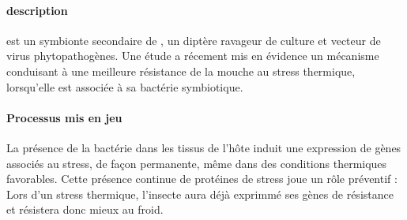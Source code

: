 \paragraph{description} %
\label{par:description_whitefly}

 est un symbionte secondaire de , un
diptère ravageur de culture et vecteur de virus phytopathogènes. Une étude
\cite{brumin2011} a récement mis en évidence un mécanisme conduisant à une
meilleure résistance de la mouche au stress thermique, lorsqu'elle est
associée à sa bactérie symbiotique.

\paragraph{Processus mis en jeu} %
\label{par:process_whitefly}

La présence de la bactérie dans les tissus de l'hôte induit une expression de
gènes associés au stress, de façon permanente, même dans des conditions
thermiques favorables. Cette présence continue de protéines de stress joue un
rôle préventif : Lors d'un stress thermique, l'insecte aura déjà exprimmé ses
gènes de résistance et résistera donc mieux au froid.
